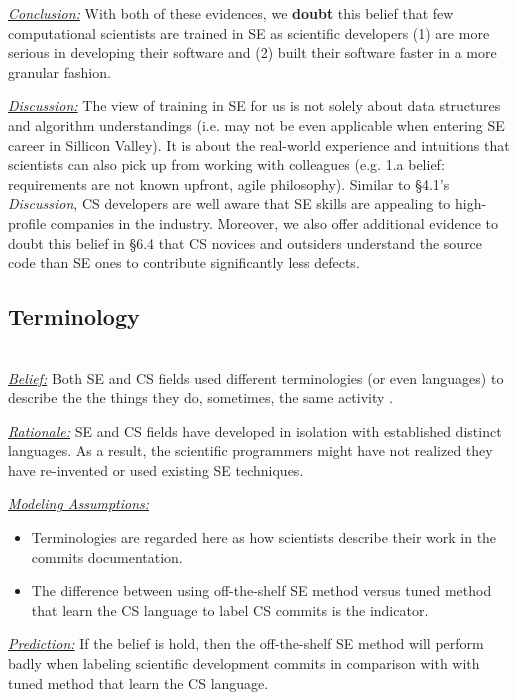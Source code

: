 \documentclass[sigconf,review,anonymous]{acmart}
\newcommand{\bi}{\begin{itemize}}
\newcommand{\ei}{\end{itemize}}
\newenvironment{RQ}{\vspace{1mm}\begin{tcolorbox}[enhanced,width=3.4in,size=fbox,colback=red!5!white,drop shadow southwest,sharp corners]}{\end{tcolorbox}}
\begin{document}
\begin{RQ}
 \textit{\underline{Conclusion:}} With both of these evidences, we \textbf{doubt} this belief that few computational scientists are trained in SE as scientific developers (1) are more serious in developing their software and (2) built their software faster in a more granular fashion.
\end{RQ}

\noindent \textit{\underline{Discussion:}} The view of training in SE for us is not solely about data structures and algorithm understandings (i.e. may not be even applicable when entering SE career in Sillicon Valley). It is about the real-world experience and intuitions that scientists can also pick up from working with colleagues (e.g. 1.a belief: requirements are not known upfront, agile philosophy). Similar to \S4.1's \textit{Discussion}, CS developers are well aware that SE skills are appealing to high-profile companies in the industry.  Moreover, we also offer additional evidence to doubt this belief in \S6.4 that CS novices and outsiders understand the source code than SE ones to contribute significantly less defects.  


\subsection{Terminology}~\\
\noindent \textit{\underline{Belief:}} Both SE and CS fields used different terminologies (or even languages) to describe the the things they do, sometimes, the same activity \cite{faulk09_secs, easterbrook_cs, boyle09_lessons}.

\noindent \textit{\underline{Rationale:}} SE and CS fields have developed in isolation with established distinct languages. As a result, the scientific programmers might have not realized they have re-invented or used existing SE techniques.

\noindent \textit{\underline{Modeling Assumptions:}} 
\bi
\item Terminologies are regarded here as how scientists describe their work in the commits documentation. 
\item The difference between using off-the-shelf SE method versus tuned method that learn the CS language to label CS commits is the indicator.
\ei

\noindent \textit{\underline{Prediction:}} If the belief is hold, then the off-the-shelf SE method will perform badly when labeling scientific development commits in comparison with with tuned method that learn the CS language.  
\end{document}
